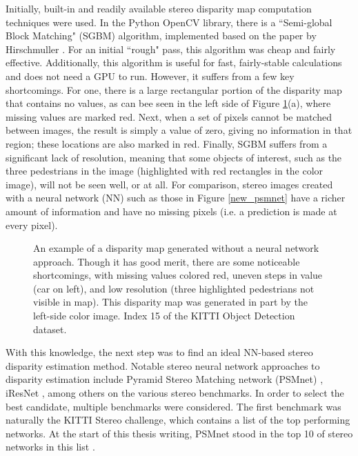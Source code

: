 Initially, built-in and readily available stereo disparity map computation techniques were used. In the Python OpenCV library, there is a ``Semi-global Block Matching" (SGBM) algorithm, implemented based on the paper by Hirschmuller \cite{hirschmuller_stereo_2007}. For an initial ``rough" pass, this algorithm was cheap and fairly effective. Additionally, this algorithm is useful for fast, fairly-stable calculations and does not need a GPU to run. However, it suffers from a few key shortcomings. For one, there is a large rectangular portion of the disparity map that contains no values, as can bee seen in the left side of Figure \ref{ind15_SGBM_comparison}(a), where missing values are marked red. Next, when a set of pixels cannot be matched between images, the result is simply a value of zero, giving no information in that region; these locations are also marked in red. Finally, SGBM suffers from a significant lack of resolution, meaning that some objects of interest, such as the three pedestrians in the image (highlighted with red rectangles in the color image), will not be seen well, or at all. For comparison, stereo images created with a neural network (NN) such as those in Figure \ref{new_psmnet} have a richer amount of information and have no missing pixels (i.e. a prediction is made at every pixel).

\begin{figure}[H]
    \centering
    \caption{An example of a disparity map generated without a neural network approach. Though it has good merit, there are some noticeable shortcomings, with missing values colored red, uneven steps in value (car on left), and low resolution (three highlighted pedestrians not visible in map). This disparity map was generated in part by the left-side color image. Index 15 of the KITTI Object Detection dataset.}
    \label{ind15_SGBM_comparison}
\end{figure}

With this knowledge, the next step was to find an ideal NN-based stereo disparity estimation method. Notable stereo neural network approaches to disparity estimation include Pyramid Stereo Matching network (PSMnet) \cite{chang_pyramid_2018},  iResNet \cite{liang_learning_2018}, among others on the various stereo benchmarks. In order to select the best candidate, multiple benchmarks were considered. The first benchmark was naturally the KITTI Stereo challenge, which contains a list of the top performing networks. At the start of this thesis writing, PSMnet stood in the top 10 of stereo networks in this list \cite{menze_kitti_2019}.

